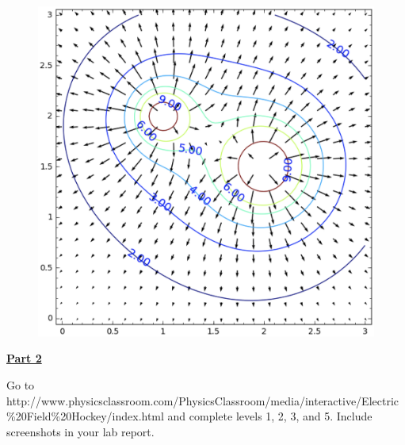 \begin{figure}[H]
\includegraphics[scale=0.50]{figures/electric-potential-fields/fig1.png}
\end{figure}

\vspace{\baselineskip}

\underline{\textbf{Part 2}} \par

Go to http://www.physicsclassroom.com/PhysicsClassroom/media/interactive/Electric\%20Field\%20Hockey/index.html and complete levels 1, 2, 3, and 5.
Include screenshots in your lab report.

\pagebreak \clearpage
